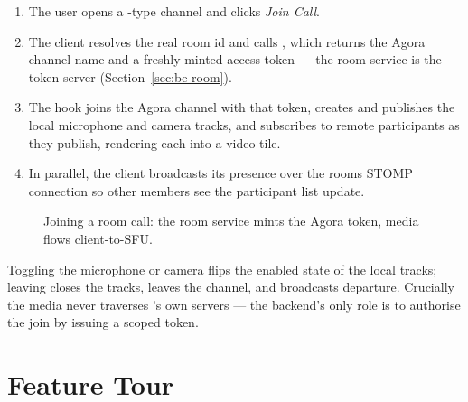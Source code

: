 \begin{enumerate}
  \item The user opens a -type channel and clicks \emph{Join Call}.
  \item The client resolves the real room id and calls
  , which returns the Agora channel name and a
  freshly minted access token --- the room service is the token server
  (Section~\ref{sec:be-room}).
  \item The hook joins the Agora channel with that token, creates and publishes
  the local microphone and camera tracks, and subscribes to remote participants
  as they publish, rendering each into a video tile.
  \item In parallel, the client broadcasts its presence over the rooms STOMP
  connection so other members see the participant list update.
\end{enumerate}

\begin{figure}[htbp]
\centering
{}
\caption{Joining a room call: the room service mints the Agora token, media flows
client-to-SFU.}
\label{fig:web-call}
\end{figure}

Toggling the microphone or camera flips the enabled state of the local tracks;
leaving closes the tracks, leaves the channel, and broadcasts departure. Crucially
the media never traverses \voname{}'s own servers --- the backend's only role is
to authorise the join by issuing a scoped token.

\section{Feature Tour}

